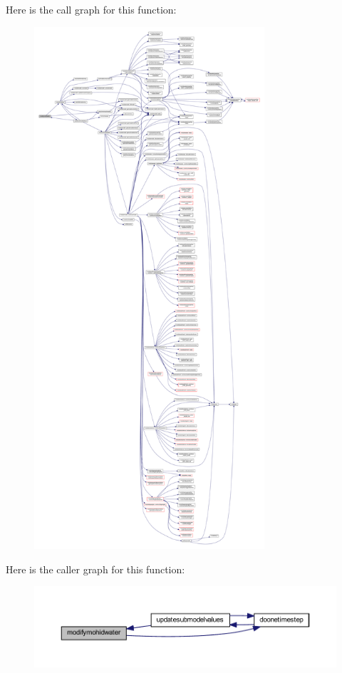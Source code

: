 Here is the call graph for this function\+:\nopagebreak
\begin{figure}[H]
\begin{center}
\leavevmode
\includegraphics[height=550pt]{_main_8_f90_a98b6185e00bdaa093569c6645482e68b_cgraph}
\end{center}
\end{figure}
Here is the caller graph for this function\+:\nopagebreak
\begin{figure}[H]
\begin{center}
\leavevmode
\includegraphics[width=350pt]{_main_8_f90_a98b6185e00bdaa093569c6645482e68b_icgraph}
\end{center}
\end{figure}
\mbox{\label{_main_8_f90_a22cacab418d9e36dcaa8c3aef44b4185}} 
